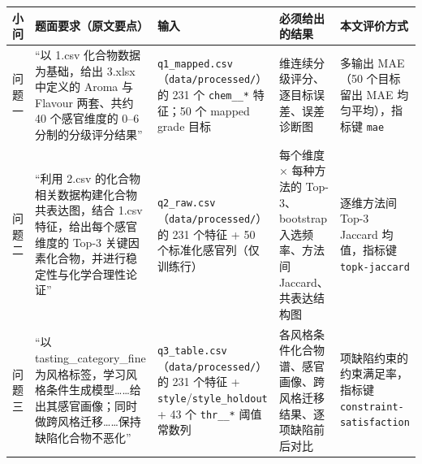 \documentclass[
  11pt,
]{ctexart}
\newcounter{none} %
\begin{document}
{\def\LTcaptype{none} %
\begin{longtable}[]{@{}
  >{\raggedright\arraybackslash}p{}
  >{\raggedright\arraybackslash}p{}
  >{\raggedright\arraybackslash}p{}
  >{\raggedright\arraybackslash}p{}
  >{\raggedright\arraybackslash}p{}@{}}
\toprule\noalign{}
\begin{minipage}[b]{\linewidth}\raggedright
小问
\end{minipage} & \begin{minipage}[b]{\linewidth}\raggedright
题面要求（原文要点）
\end{minipage} & \begin{minipage}[b]{\linewidth}\raggedright
输入
\end{minipage} & \begin{minipage}[b]{\linewidth}\raggedright
必须给出的结果
\end{minipage} & \begin{minipage}[b]{\linewidth}\raggedright
本文评价方式
\end{minipage} \\
\midrule\noalign{}
\endhead
\bottomrule\noalign{}
\endlastfoot
问题一 & ``以 1.csv 化合物数据为基础，给出 3.xlsx 中定义的 Aroma 与
Flavour 两套、共约 40 个感官维度的 0--6 分制的分级评分结果'' &
\texttt{q1\_\allowbreak{}mapped.\allowbreak{}csv}（\texttt{data/\allowbreak{}processed/\allowbreak{}}）的 231 个
\texttt{chem\_\_*} 特征；50 个 mapped grade 目标 & 50
维连续分级评分、逐目标误差、误差诊断图 & 多输出 MAE（50 个目标留出 MAE
均匀平均），指标键 \texttt{mae} \\
问题二 & ``利用 2.csv 的化合物相关数据构建化合物共表达图，结合 1.csv
特征，给出每个感官维度的 Top-3
关键因素化合物，并进行稳定性与化学合理性论证'' &
\texttt{q2\_raw.csv}（\texttt{data/\allowbreak{}processed/\allowbreak{}}）的 231 个特征 + 50
个标准化感官列（仅训练行） & 每个维度 × 每种方法的 Top-3、bootstrap
入选频率、方法间 Jaccard、共表达结构图 & 逐维方法间 Top-3 Jaccard
均值，指标键 \texttt{topk-jaccard} \\
问题三 & ``以 tasting\_category\_fine
为风格标签，学习风格条件生成模型\ldots\ldots 给出其感官画像；同时做跨风格迁移\ldots\ldots 保持缺陷化合物不恶化''
& \texttt{q3\_table.csv}（\texttt{data/\allowbreak{}processed/\allowbreak{}}）的 231 个特征 +
\texttt{style}/\texttt{style\_\allowbreak{}holdout} + 43 个 \texttt{thr\_\_*}
阈值常数列 &
各风格条件化合物谱、感官画像、跨风格迁移结果、逐项缺陷前后对比 & 7
项缺陷约束的约束满足率，指标键 \texttt{constraint-satisfaction} \\
\end{longtable}
}
\end{document}
